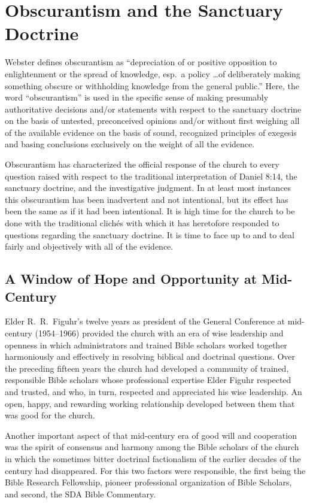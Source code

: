 \chapter{Obscurantism and the Sanctuary Doctrine}
\label{ch:obscurantism}

Webster defines obscurantism as ``depreciation of or positive opposition to
enlightenment or the spread of knowledge, esp.\ a policy \ldots of deliberately
making something obscure or withholding knowledge from the general public.''
Here, the word ``obscurantism'' is used in the specific sense of making
presumably authoritative decisions and/or statements with respect to the
sanctuary doctrine on the basis of untested, preconceived opinions and/or
without first weighing all of the available evidence on the basis of sound,
recognized principles of exegesis and basing conclusions exclusively on the
weight of all the evidence.

Obscurantism has characterized the official response of the church to every
question raised with respect to the traditional interpretation of Daniel
8:14, the sanctuary doctrine, and the investigative judgment. In at least
most instances this obscurantism has been inadvertent and not intentional,
but its effect has been the same as if it had been intentional. It is high
time for the church to be done with the traditional clichés with which it
has heretofore responded to questions regarding the sanctuary doctrine. It
is time to face up to and to deal fairly and objectively with all of the
evidence.

\section{A Window of Hope and Opportunity at Mid-Century}

Elder R.\ R.\ Figuhr's twelve years as president of the General Conference at
mid-century (1954--1966) provided the church with an era of wise leadership
and openness in which administrators and trained Bible scholars worked
together harmoniously and effectively in resolving biblical and doctrinal
questions. Over the preceding fifteen years the church had developed a
community of trained, responsible Bible scholars whose professional
expertise Elder Figuhr respected and trusted, and who, in turn, respected
and appreciated his wise leadership. An open, happy, and rewarding working
relationship developed between them that was good for the church.

Another important aspect of that mid-century era of good will and
cooperation was the spirit of consensus and harmony among the Bible scholars
of the church in which the sometimes bitter doctrinal factionalism of the
earlier decades of the century had disappeared. For this two factors were
responsible, the first being the Bible Research Fellowship, pioneer
professional organization of Bible Scholars, and second, the SDA Bible
Commentary.

